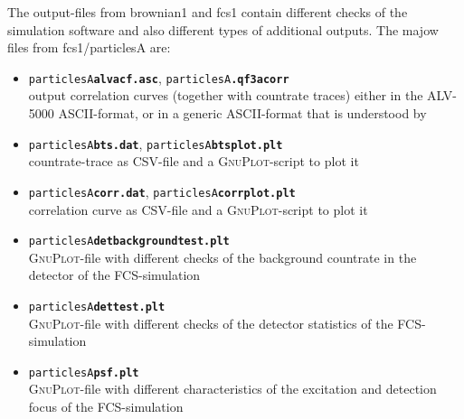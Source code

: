 The output-files from brownian1 and fcs1 contain different checks of the simulation software and also different types of additional outputs. The majow files from fcs1/particlesA are:
\begin{itemize}
	\item \texttt{particlesA\textbf{alvacf.asc}}, \texttt{particlesA\textbf{.qf3acorr}}\\ output correlation curves (together with countrate traces) either in the ALV-5000 ASCII-format, or in a generic ASCII-format that is understood by \qf
	\item \texttt{particlesA\textbf{bts.dat}}, \texttt{particlesA\textbf{btsplot.plt}}\\ countrate-trace as CSV-file and a \textsc{GnuPlot}-script to plot it
	\item \texttt{particlesA\textbf{corr.dat}}, \texttt{particlesA\textbf{corrplot.plt}}\\correlation curve as CSV-file and a \textsc{GnuPlot}-script to plot it
	\item \texttt{particlesA\textbf{detbackgroundtest.plt}}\\\textsc{GnuPlot}-file with different checks of the background countrate in the detector of the FCS-simulation
	\item \texttt{particlesA\textbf{dettest.plt}}\\\textsc{GnuPlot}-file with different checks of the detector statistics of the FCS-simulation
	\item \texttt{particlesA\textbf{psf.plt}}\\\textsc{GnuPlot}-file with different characteristics of the excitation and detection focus of the FCS-simulation
\end{itemize}

